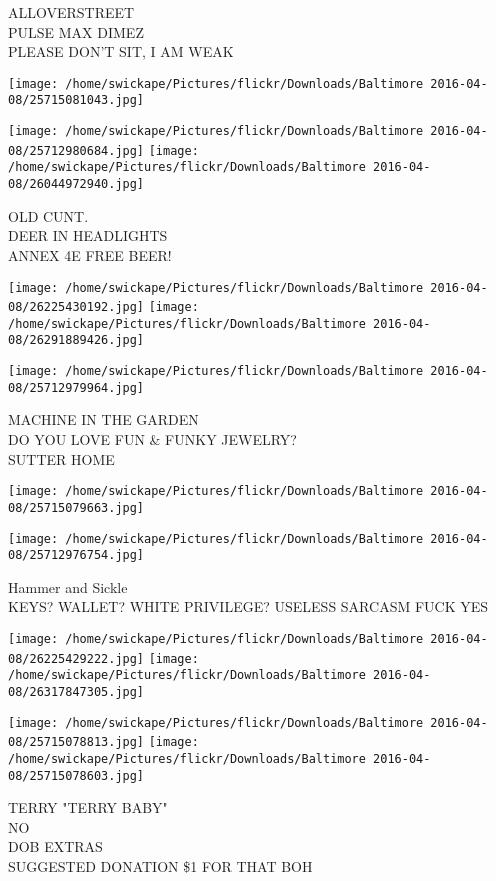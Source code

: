 \documentclass[10pt,letterpaper]{article}
\begin{document}
ALLOVERSTREET\\
PULSE MAX DIMEZ\\
PLEASE DON'T SIT, I AM WEAK
\pagebreak

\texttt{[image: /home/swickape/Pictures/flickr/Downloads/Baltimore 2016-04-08/25715081043.jpg]}

\vspace{0.25in}
\texttt{[image: /home/swickape/Pictures/flickr/Downloads/Baltimore 2016-04-08/25712980684.jpg]}
\texttt{[image: /home/swickape/Pictures/flickr/Downloads/Baltimore 2016-04-08/26044972940.jpg]}

OLD CUNT.\\
DEER IN HEADLIGHTS\\
ANNEX 4E FREE BEER!
\pagebreak

\texttt{[image: /home/swickape/Pictures/flickr/Downloads/Baltimore 2016-04-08/26225430192.jpg]}
\texttt{[image: /home/swickape/Pictures/flickr/Downloads/Baltimore 2016-04-08/26291889426.jpg]}

\texttt{[image: /home/swickape/Pictures/flickr/Downloads/Baltimore 2016-04-08/25712979964.jpg]}

MACHINE IN THE GARDEN\\
DO YOU LOVE FUN \& FUNKY JEWELRY?\\
SUTTER HOME
\pagebreak

\texttt{[image: /home/swickape/Pictures/flickr/Downloads/Baltimore 2016-04-08/25715079663.jpg]}

\vspace{0.25in}
\texttt{[image: /home/swickape/Pictures/flickr/Downloads/Baltimore 2016-04-08/25712976754.jpg]}

Hammer and Sickle\\
KEYS?  WALLET?  WHITE PRIVILEGE?  USELESS SARCASM FUCK YES
\pagebreak

\texttt{[image: /home/swickape/Pictures/flickr/Downloads/Baltimore 2016-04-08/26225429222.jpg]}
\texttt{[image: /home/swickape/Pictures/flickr/Downloads/Baltimore 2016-04-08/26317847305.jpg]}

\texttt{[image: /home/swickape/Pictures/flickr/Downloads/Baltimore 2016-04-08/25715078813.jpg]}
\texttt{[image: /home/swickape/Pictures/flickr/Downloads/Baltimore 2016-04-08/25715078603.jpg]}

TERRY "TERRY BABY"\\
NO\\
DOB EXTRAS\\
SUGGESTED DONATION \$1 FOR THAT BOH
\pagebreak
\end{document}
